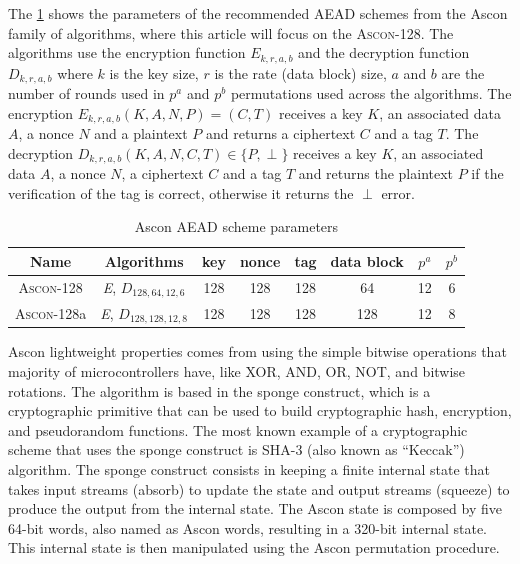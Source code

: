 \documentclass[11pt,twoside]{article}
\begin{document}
The \cref{table:aeadParameters} shows the parameters of the recommended AEAD schemes from the Ascon family of algorithms, where this article will focus on the \textsc{Ascon-128}. The algorithms use the encryption function $\textit{E}_{k,r,a,b}$ and the decryption function $\textit{D}_{k,r,a,b}$ where $k$ is the key size, $r$ is the rate (data block) size, $a$ and $b$ are the number of rounds used in $p^a$ and $p^b$ permutations used across the algorithms. The encryption $\textit{E}_{k,r,a,b}(K, A, N, P) = (C, T)$ receives a key $K$, an associated data $A$, a nonce $N$ and a plaintext $P$ and returns a ciphertext $C$ and a tag $T$. The decryption $\textit{D}_{k,r,a,b}(K, A, N, C, T) \in \{P, \perp\}$ receives a key $K$, an associated data $A$, a nonce $N$, a ciphertext $C$ and a tag $T$ and returns the plaintext $P$ if the verification of the tag is correct, otherwise it returns the $\perp$ error.

\begin{table} [h]
  \centering
  \begin{tabular}{|c|c|cccc|cc|}
    \hline
    \textbf{Name}       & \textbf{Algorithms}                     & \textbf{key} & \textbf{nonce} & \textbf{tag} & \textbf{data block} & \textbf{$p^a$} & \textbf{$p^b$} \\ \hline
    \textsc{Ascon-128}  & \textit{E}, $\textit{D}_{128,64,12,6}$  & 128          & 128            & 128          & 64                  & 12             & 6              \\ \hline
    \textsc{Ascon-128}a & \textit{E}, $\textit{D}_{128,128,12,8}$ & 128          & 128            & 128          & 128                 & 12             & 8              \\ \hline
  \end{tabular}
  \caption{Ascon AEAD scheme parameters}
  \label{table:aeadParameters}
\end{table}

Ascon lightweight properties comes from using the simple bitwise operations that majority of microcontrollers have, like XOR, AND, OR, NOT, and bitwise rotations. The algorithm is based in the sponge construct, which is a cryptographic primitive that can be used to build cryptographic hash, encryption, and pseudorandom functions. The most known example of a cryptographic scheme that uses the sponge construct is SHA-3 (also known as “Keccak”) \cite{bertoni2015keccak} algorithm. The sponge construct consists in keeping a finite internal state that takes input streams (absorb) to update the state and output streams (squeeze) to produce the output from the internal state. The Ascon state is composed by five 64-bit words, also named as Ascon words, resulting in a 320-bit internal state. This internal state is then manipulated using the Ascon permutation procedure.
\end{document}
